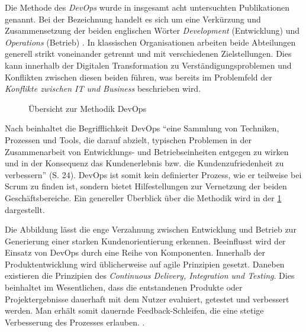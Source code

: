Die Methode des \textit{DevOps} wurde in insgesamt acht untersuchten Publikationen genannt. Bei der Bezeichnung handelt es sich um eine Verkürzung und Zusammensetzung der beiden englischen Wörter \textit{Development} (Entwicklung) und \textit{Operations} (Betrieb) \cite[S. 23]{alt_innovationsorientiertes_2017}. In klassischen Organisationen arbeiten beide Abteilungen generell strikt voneinander getrennt und mit verschiedenen Zielstellungen. Dies kann innerhalb der Digitalen Transformation zu Verständigungsproblemen und Konflikten zwischen diesen beiden führen, was bereits im Problemfeld der \textit{Konflikte zwischen IT und Business} beschrieben wird.


\begin{figure}[H]
	\centering
	\caption[Übersicht zur Methodik DevOps]{Übersicht zur Methodik DevOps \protect \cite[S. 28]{alt_innovationsorientiertes_2017}}
	\label{fig:devops}
\end{figure}

Nach  beinhaltet die Begrifflichkeit DevOps ``eine Sammlung von Techniken, Prozessen und Tools, die darauf abzielt, typischen Problemen in der Zusammenarbeit von Entwicklungs- und Betriebseinheiten entgegen zu wirken und in der Konsequenz das Kundenerlebnis bzw. die Kundenzufriedenheit zu verbessern'' (S. 24). DevOps ist somit kein definierter Prozess, wie er teilweise bei Scrum zu finden ist, sondern bietet Hilfestellungen zur Vernetzung der beiden Geschäftsbereiche. Ein genereller Überblick über die Methodik wird in der \ref{fig:devops} dargestellt.


Die Abbildung lässt die enge Verzahnung zwischen Entwicklung und Betrieb zur Generierung einer starken Kundenorientierung erkennen. Beeinflusst wird der Einsatz von DevOps durch eine Reihe von Komponenten. Innerhalb der Produktentwicklung wird üblicherweise auf agile Prinzipien gesetzt. Daneben existieren die Prinzipien des \textit{Continuous Delivery, Integration und Testing}. Dies beinhaltet im Wesentlichen, dass die entstandenen Produkte oder Projektergebnisse dauerhaft mit dem Nutzer evaluiert, getestet und verbessert werden. Man erhält somit dauernde Feedback-Schleifen, die eine stetige Verbesserung des Prozesses erlauben. \cite{alt_innovationsorientiertes_2017}.

